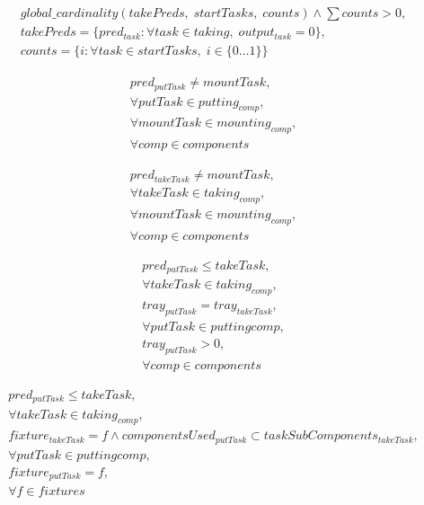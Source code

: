 \documentclass[10pt,a4paper]{report}
\begin{document}
\begin{align*}
global\_cardinality(takePreds, \; startTasks, \; counts) \land \sum counts > 0,\\
takePreds = \{pred_{task} : \forall task \in taking, \; output_{task} = 0\},\\
counts = \{i : \forall task \in startTasks, \; i \in \{0 \ldots 1\}\}
\end{align*}



\begin{align*}
pred_{putTask} \neq mountTask,\\
\forall putTask \in putting_{comp},\\
\forall mountTask \in mounting_{comp},\\
\forall comp \in components
\end{align*}



\begin{align*}
pred_{takeTask} \neq mountTask,\\
\forall takeTask \in taking_{comp},\\
\forall mountTask \in mounting_{comp},\\
\forall comp \in components
\end{align*}



\begin{align*}
pred_{putTask} \le takeTask,\\
\forall takeTask \in taking_{comp},\\
tray_{putTask} = tray_{takeTask},\\
\forall putTask \in putting{comp},\\
tray_{putTask} > 0,\\
\forall comp \in components
\end{align*}



\begin{align*}
pred_{putTask} \le takeTask,\\
\forall takeTask \in taking_{comp},\\
fixture_{takeTask} = f \land componentsUsed_{putTask} \subset taskSubComponents_{takeTask},\\
\forall putTask \in putting{comp},\\
fixture_{putTask} = f,\\
\forall f \in fixtures
\end{align*}
\end{document}
